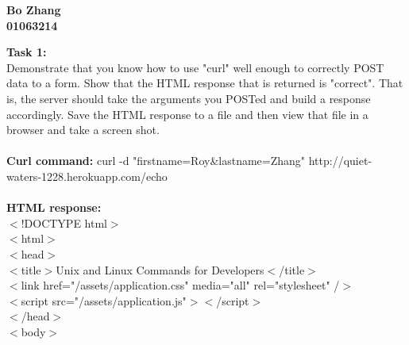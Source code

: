 \documentclass{article}
\begin{document}
		\begin{center}\textbf{Bo Zhang\\01063214\\}
		\end{center}
		\noindent
		\textbf{Task 1:}\\
		Demonstrate that you know how to use "curl" well enough to correctly POST data to a form.  Show that the HTML response that is returned is "correct".  That is, the server should take the arguments you POSTed and build a response accordingly.  Save the HTML response to a file and then view that file in a browser and take a screen shot.\\\\
		\textbf{Curl command:} curl -d "firstname=Roy\&lastname=Zhang" http://quiet-waters-1228.herokuapp.com/echo\\\\
		\textbf{HTML response:}\\
			$<$!DOCTYPE html$>$\\
			$<$html$>$\\
			$<$head$>$\\
			\indent
			  $<$title$>$Unix and Linux Commands for Developers$<$/title$>$\\
			\indent
			  $<$link href="/assets/application.css" media="all" rel="stylesheet" /$>$\\
			\indent
			  $<$script src="/assets/application.js"$>$$<$/script$>$\\
			$<$/head$>$\\
			$<$body$>$\\
\end{document}
